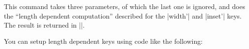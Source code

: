 \begin{command}{\pgfarrowslengthdependent{}}
    This command takes three parameters, of which the last one is ignored, and
    does the ``length dependent computation'' described for the |width'| and
    |inset'| keys. The result is returned in |\pgf@x|.

    You can setup length dependent keys using code like the following:
\begin{codeexample}[code only]
\pgfkeys{/pgf/arrow keys/depth'/.code={%
  \pgfarrowsthreeparameters{#1}%
  \expandafter\pgfarrowsaddtolateoptions\expandafter{%
    \expandafter\pgfarrowslengthdependent\pgfarrowstheparameters%
    \pgfarrowdepth\pgf@x%
  }%
}
\end{codeexample}
\end{command}


